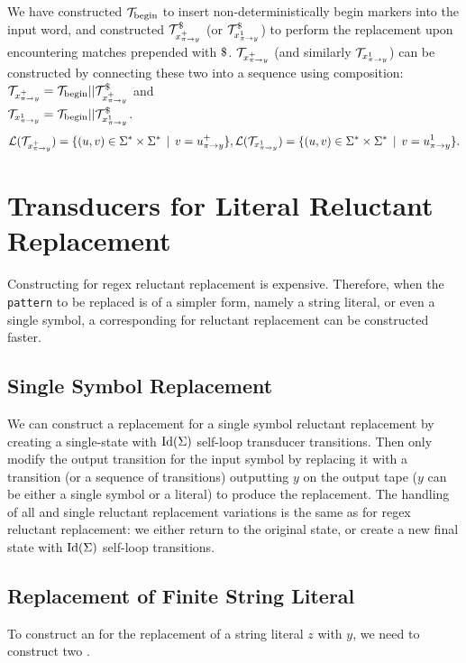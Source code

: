 We have constructed $\mathcal{T}_{\text{begin}}$ to insert non-deterministically begin markers into the input word, and constructed $\mathcal{T}^\$_{x^{+}_{\pi \rightarrow y}}$ (or $\mathcal{T}^\$_{x^{1}_{\pi \rightarrow y}}$) to perform the replacement upon encountering matches prepended with $\marker$.
$\mathcal{T}_{x^{+}_{\pi \rightarrow y}}$ (and similarly $\mathcal{T}_{x^{1}_{\pi \rightarrow y}}$) can be constructed by connecting these two \nfts into a sequence using composition: $\mathcal{T}_{x^{+}_{\pi \rightarrow y}} = \mathcal{T}_{\text{begin}} || \mathcal{T}^\$_{x^{+}_{\pi \rightarrow y}}$ and \\$\mathcal{T}_{x^{1}_{\pi \rightarrow y}} = \mathcal{T}_{\text{begin}} || \mathcal{T}^\$_{x^{1}_{\pi \rightarrow y}}$.
$$\mathcal{L}(\mathcal{T}_{x^{+}_{\pi \rightarrow y}}) = \{ (u, v) \in \Sigma^* \times \Sigma^* \,\mid\, v = u^{+}_{\pi \rightarrow y} \}, \mathcal{L}(\mathcal{T}_{x^{1}_{\pi \rightarrow y}}) = \{ (u, v) \in \Sigma^* \times \Sigma^* \,\mid\, v = u^{1}_{\pi \rightarrow y} \} \text{.}$$

\section{Transducers for Literal Reluctant Replacement}

Constructing \nfts for regex reluctant replacement is expensive.
Therefore, when the \texttt{pattern} to be replaced is of a simpler form, namely a string literal, or even a single symbol, a corresponding \nft for reluctant replacement can be constructed faster.

\subsection{Single Symbol Replacement}

We can construct a replacement \dft for a single symbol reluctant replacement by creating a single-state \dft with $\text{Id}(\Sigma)$ self-loop transducer transitions.
Then only modify the output transition for the input symbol by replacing it with a transition (or a sequence of transitions) outputting $y$ on the output tape ($y$ can be either a single symbol or a literal) to produce the replacement.
The handling of all and single reluctant replacement variations is the same as for regex reluctant replacement: we either return to the original state, or create a new final state with $\text{Id}(\Sigma)$ self-loop transitions.

\subsection{Replacement of Finite String Literal}

To construct an \nft for the replacement of a string literal $z$ with $y$, we need to construct two \nfts.

